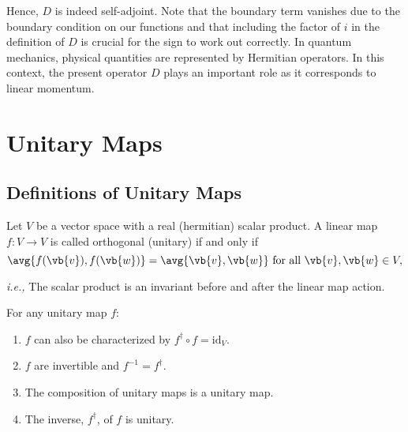 \documentclass[a4paper,12pt]{report}
\begin{document}
Hence, $D$ is indeed self-adjoint. Note that the boundary term vanishes due to the boundary condition on our functions and that including the factor of $i$ in the definition of $D$ is crucial for the sign to work out correctly. In quantum mechanics, physical quantities are represented by Hermitian operators. In this context, the present operator $D$ plays an important role as it corresponds to linear momentum.

\section{ Unitary Maps} \label{unitary} 

\subsection{Definitions of Unitary Maps}

\begin{definition}
Let \(V\) be a vector space with a real (hermitian) scalar product. A linear map \(f: V \rightarrow V\) is called orthogonal (unitary) if and only if 
\begin{equation} \label{unitarydef} 
    \avg{f(\vb{v} ), f(\vb{w} )} = \avg{\vb{v} ,\vb{w} } \text{ for all } \vb{v} ,\vb{w} \in V,
\end{equation}

\textit{i.e.,} The scalar product is an invariant before and after the linear map action.
\end{definition}

\begin{lemma}
For any unitary map \(f\):
\begin{enumerate}[label=(\(N\)\arabic*)]
    \item  \(f\) can also be characterized by \(f^{\dagger} \circ f = \mathrm{id}_{V} \).
    \item  \(f\) are invertible and \(f^{-1} = f^{\dagger} \). 
    \item The composition of unitary maps is a unitary map.
    \item The inverse, \(f^{\dagger} \), of \(f\) is unitary.  
\end{enumerate}

\end{lemma}
\end{document}
